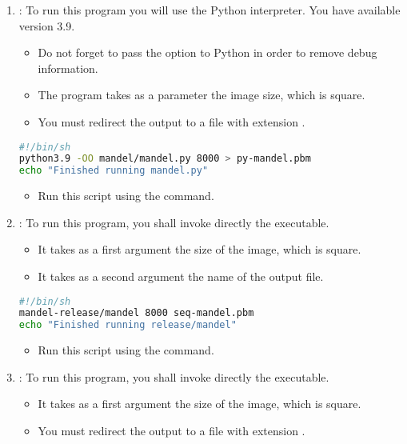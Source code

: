 \begin{enumerate}
  \item {}: 
        To run this program you will use the Python interpreter.
        You have available version 3.9.

    \begin{itemize}
      \item Do not forget to pass the option  to Python in order
            to remove debug information.
      \item The program takes as a parameter the image size, which is square.
      \item You must redirect the output to a file with extension .
    \end{itemize}

\begin{lstlisting}[language=bash,title={File: runpy.sh},frame=single]
#!/bin/sh
python3.9 -OO mandel/mandel.py 8000 > py-mandel.pbm
echo "Finished running mandel.py"
\end{lstlisting}

    \begin{itemize}
      \item Run this script using the  command.
    \end{itemize}

  \item {}: 
        To run this program, you shall invoke directly the executable.
    \begin{itemize}
      \item It takes as a first argument the size of the image, which is square.
      \item It takes as a second argument the name of the output file.
    \end{itemize}

\begin{lstlisting}[language=bash,title={File: run-seq-mandel.sh},frame=single]
#!/bin/sh
mandel-release/mandel 8000 seq-mandel.pbm
echo "Finished running release/mandel"
\end{lstlisting}
    \begin{itemize}
      \item Run this script using the  command.
    \end{itemize}

  \item {}: 
        To run this program, you shall invoke directly the executable.
    \begin{itemize}
      \item It takes as a first argument the size of the image, which is square.
      \item You must redirect the output to a file with extension .
    \end{itemize}


\end{enumerate}
